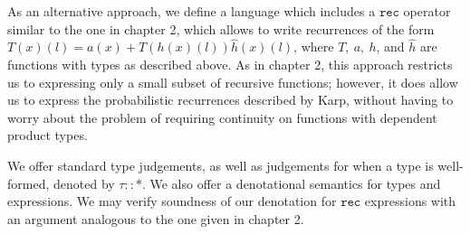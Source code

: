 As an alternative approach, we define a language which includes a $\texttt{rec}$ operator similar to the one in chapter 2,
 which allows to write recurrences of the form $T(x)(l) = a(x) + T(h(x)(l))\hat{h}(x)(l)$, where $T, \ a, \ h$, and $\hat{h}$ 
 are functions with types as described above. As in chapter 2, this approach restricts us to expressing only a small subset
 of recursive functions; however, it does allow us to express the probabilistic recurrences described by Karp,
 without having to worry about the problem of requiring continuity on functions with dependent product types. 

We offer standard type judgements, as well as judgements for when a type is well-formed, denoted by $\tau :: *$. We 
 also offer a denotational semantics for types and expressions. We may verify soundness of our denotation for
 $\texttt{rec}$ expressions with an argument analogous to the one given in chapter 2. 

